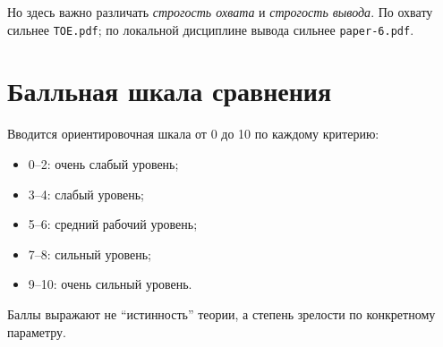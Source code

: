 \documentclass[12pt,a4paper]{article}
\begin{document}
Но здесь важно различать \emph{строгость охвата} и \emph{строгость вывода}. По охвату сильнее \texttt{TOE.pdf}; по локальной дисциплине вывода сильнее \texttt{paper-6.pdf}.

\section{Балльная шкала сравнения}

Вводится ориентировочная шкала от 0 до 10 по каждому критерию:
\begin{itemize}
    \item 0--2: очень слабый уровень;
    \item 3--4: слабый уровень;
    \item 5--6: средний рабочий уровень;
    \item 7--8: сильный уровень;
    \item 9--10: очень сильный уровень.
\end{itemize}

Баллы выражают не ``истинность'' теории, а степень зрелости по конкретному параметру.
\end{document}
